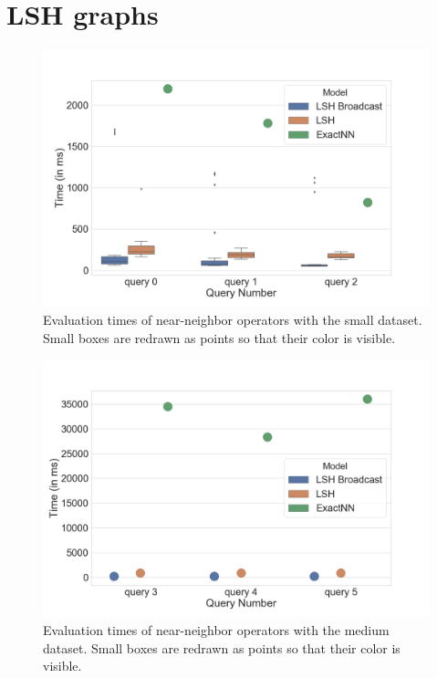 \documentclass[a4paper,10pt]{IEEEtran}
\begin{document}
\section*{LSH graphs}

\begin{figure}[!ht]
    \centering
    \includegraphics[width=\linewidth]{"lsh_small.png"}
    \caption{Evaluation times of near-neighbor operators with the small dataset. Small boxes are redrawn as points so that their color is visible.}
    \label{fig:lsh-small}
\end{figure}

\begin{figure}[!ht]
    \centering
    \includegraphics[width=\linewidth]{"lsh_medium.png"}
    \caption{Evaluation times of near-neighbor operators with the medium dataset. Small boxes are redrawn as points so that their color is visible.}
    \label{fig:lsh-medium}
\end{figure}
\end{document}
